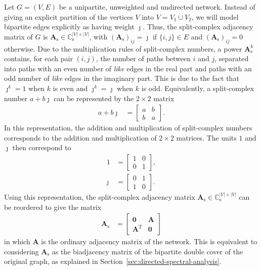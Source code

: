 \documentclass[11pt,a4paper]{book}
\newcommand{\dunion}{\mathbin{\dot\cup}} %
\begin{document}
Let $G=(V,E)$ be a unipartite, unweighted and undirected network.
Instead of giving an explicit partition of the vertices $V$ into $V= V_1
\dunion V_2$, we will model bipartite edges explicitly as having weight
$\jmath$.  
Thus, the split-complex adjacency matrix of $G$ is $\mathbf A_{\mathrm s} \in \mathbb C_{\mathrm
  s}^{|V|\times |V|}$, with $(\mathbf A_{\mathrm s})_{ij}=\jmath$ if $\{i,j\} \in E$ and
$(\mathbf A_{\mathrm s})_{ij} = 0$ otherwise. 
Due to the multiplication rules of split-complex numbers, a power
$\mathbf A_{\mathrm s}^k$ contains, for each pair $(i,j)$, the number of paths
between $i$ and $j$, separated into paths with an even number of
\emph{like} edges in the real part and paths with an odd number of
\emph{like} edges in the imaginary part. 
This is due to the fact that $\jmath^k=1$ when $k$ is even and
$\jmath^k=\jmath$ when $k$ is odd. 
Equivalently, a split-complex number $a+b\jmath$ can be represented by
the $2\times 2$ matrix
\begin{align*}
  a+b \jmath &=
  \left[ \begin{array}{cc} a & b \\ b & a \end{array} \right].
\end{align*}
In this representation, the addition and multiplication of split-complex
numbers corresponds to the addition and multiplication of $2 \times 2$
matrices. 
The units $1$ and $\jmath$ then correspond to
\begin{align*}
  1 &= \left[ \begin{array}{cc} 1 & 0 \\ 0 & 1 \end{array} \right], \\
  \jmath &=
  \left[ \begin{array}{cc} 0 & 1 \\ 1 & 0 \end{array} \right].  
\end{align*}
Using
this representation, the split-complex adjacency matrix $\mathbf
A_{\mathrm s} \in
\mathbb C_{\mathrm s}^{|V|\times|V|}$ can be reordered to give the matrix
\begin{align*}
  \mathbf A_{\mathrm s} &=
  \left[ \begin{array}{cc} \mathbf 0 & \mathbf A \\ \mathbf A^{\mathrm T}
      & \mathbf 0 \end{array} \right]
\end{align*}
in which $\mathbf A$ is the ordinary adjacency matrix of the network. 
This is equivalent to considering
$\mathbf A_{\mathrm s}$ as the biadjacency matrix of the 
bipartite double cover
of the original graph, as explained in
Section~\ref{sec:directed-spectral-analysis}.  
\end{document}
